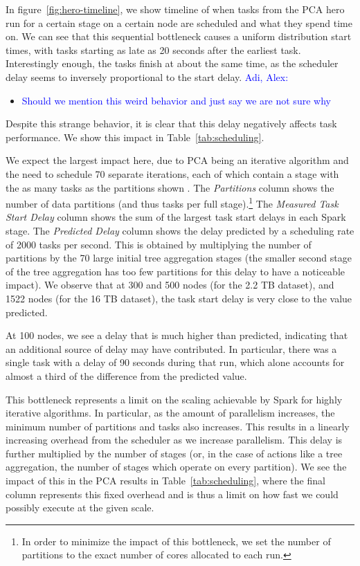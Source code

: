 In figure~\ref{fig:hero-timeline}, we show timeline of when tasks from the PCA hero run for a certain stage on a certain node are scheduled and what they spend time on. We can see that this sequential bottleneck causes a uniform distribution start times, with tasks starting as late as 20 seconds after the earliest task. Interestingly enough, the tasks finish at about the same time, as the scheduler delay seems to inversely proportional to the start delay. \textcolor{blue}{Adi, Alex:}
\begin{itemize}
\item \textcolor{blue}{Should we mention this weird behavior and just say we are not sure why }
\end{itemize}
Despite this strange behavior, it is clear that this delay negatively affects task performance. We show this impact in Table~\ref{tab:scheduling}.  

We expect the largest impact here, due to PCA being an iterative algorithm and the need to schedule 70 separate iterations, each of which contain a stage with the as many tasks as the partitions shown . The \emph{Partitions} column shows the number of data partitions (and thus tasks per full stage).\footnote{In order to minimize the impact of this bottleneck, we set the number of partitions to the exact number of cores allocated to each run.}  The \emph{Measured Task Start Delay} column shows the sum of the largest task start delays in each Spark stage.  The \emph{Predicted Delay} column shows the delay predicted by a scheduling rate of 2000 tasks per second.  This is obtained by multiplying the number of partitions by the 70 large initial tree aggregation stages (the smaller second stage of the tree aggregation has too few partitions for this delay to have a noticeable impact).  We observe that at 300 and 500 nodes (for the 2.2 TB dataset), and 1522 nodes (for the 16 TB dataset), the task start delay is very close to the value predicted. 

At 100 nodes, we see a delay that is much higher than predicted, indicating that an additional source of delay may have contributed.  In particular, there was a single task with a delay of 90 seconds during that run, which alone accounts for almost a third of the difference from the predicted value.

This bottleneck represents a limit on the scaling achievable by Spark for highly iterative algorithms.  In particular, as the amount of parallelism increases, the minimum number of partitions and tasks also increases.  This results in a linearly increasing overhead from the scheduler as we increase parallelism.  This delay is further multiplied by the number of stages (or, in the case of actions like a tree aggregation, the number of stages which operate on every partition).  We see the impact of this in the PCA results in Table~\ref{tab:scheduling}, where the final column represents this fixed overhead and is thus a limit on how fast we could possibly execute at the given scale.  
